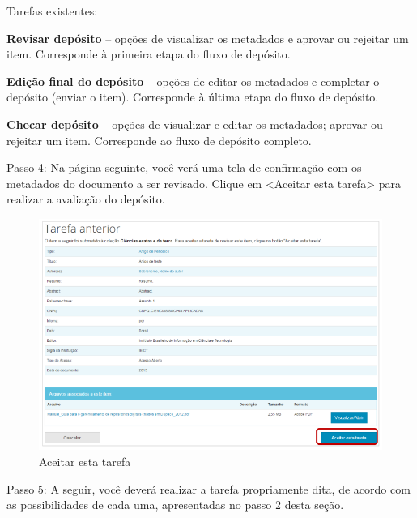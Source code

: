 \documentclass[12pt,hidelinks]{article}
\begin{document}
    Tarefas existentes:
    
    \singlespacing
    
    \textbf{Revisar depósito} – opções de visualizar os metadados e aprovar ou rejeitar um item. Corresponde à primeira etapa do fluxo de depósito.
    
    \singlespacing
    
    \textbf{Edição final do depósito} – opções de editar os metadados e completar o depósito (enviar o item). Corresponde à última etapa do fluxo de depósito.
    
    \singlespacing
    
    \textbf{Checar depósito} – opções de visualizar e editar os metadados; aprovar ou rejeitar um item. Corresponde ao fluxo de depósito completo.
    
    \singlespacing
    
    Passo 4: Na página seguinte, você verá uma tela de confirmação com os metadados do documento a ser revisado. Clique em <Aceitar esta tarefa> para realizar a avaliação do depósito.
    
    \begin{figure}[!htp]
                \centering
                \includegraphics[scale=0.7]{figura/Figura171.png}
                \caption{Aceitar esta tarefa}
            \label{Rotulo}
        \end{figure}
    
\newpage

    Passo 5: A seguir, você deverá realizar a tarefa propriamente dita, de acordo com as possibilidades de cada uma, apresentadas no passo 2 desta seção.
    
\end{document}

